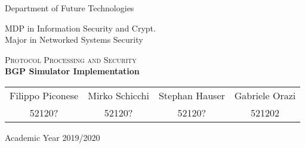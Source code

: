 \pagestyle{plain}

\thispagestyle{empty}

\begin{center}
  \begin{figure}[h!]
    \centerline{}
  \end{figure}


  \LARGE{Department of Future Technologies}
  
  \vspace{1 cm} 
  \Large{MDP in Information Security and Crypt.\\
  Major in Networked Systems Security}

  \vspace{2 cm}
  \vspace{1 cm} 
  \Huge\textsc{Protocol Processing and Security\\}
  \vspace{1cm}
  \LARGE{\textbf{BGP Simulator Implementation}\\}


  \vspace{4 cm}
  \begin{tabular}{cccc}
    Filippo Piconese & Mirko Schicchi & Stephan Hauser & Gabriele Orazi\\
    52120? & 52120? & 52120? & 521202\\
  \end{tabular}

  \vfill
  
  {\Large{Academic Year 2019/2020}}
\end{center}
